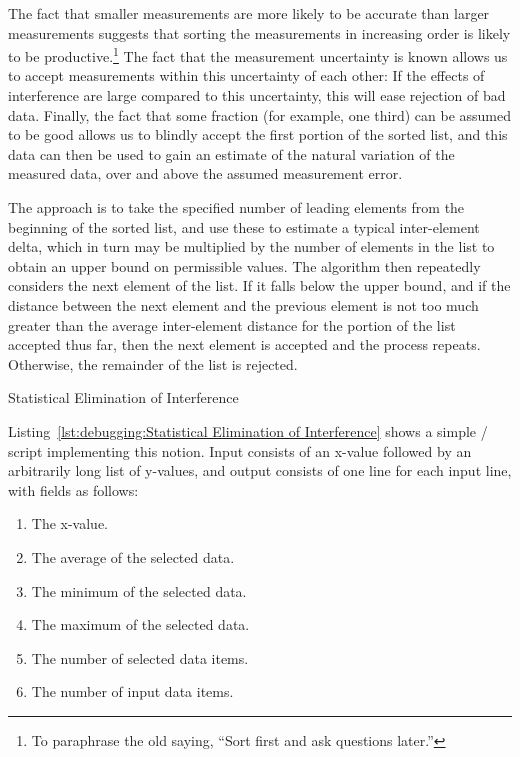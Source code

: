 The fact that smaller measurements are more likely to be accurate than
larger measurements suggests that sorting the measurements in increasing
order is likely to be productive.\footnote{
	To paraphrase the old saying, ``Sort first and ask questions later.''}
The fact that the measurement uncertainty is known allows us to accept
measurements within this uncertainty of each other:  If the effects of
interference are large compared to this uncertainty, this will ease
rejection of bad data.
Finally, the fact that some fraction (for example, one third) can be
assumed to be good allows us to blindly accept the first portion of the
sorted list, and this data can then be used to gain an estimate of the
natural variation of the measured data, over and above the assumed
measurement error.

The approach is to take the specified number of leading elements from the
beginning of the sorted list, and use these to estimate a typical
inter-element delta, which in turn may be multiplied by the number of
elements in the list to obtain an upper bound on permissible values.
The algorithm then repeatedly considers the next element of the list.
If it falls below the upper bound, and if the distance between
the next element and the previous element is not too much greater than
the average inter-element distance for the portion of the list accepted
thus far, then the next element is accepted and the process repeats.
Otherwise, the remainder of the list is rejected.

\begin{listing}[tb]

\caption{Statistical Elimination of Interference}
\label{lst:debugging:Statistical Elimination of Interference}
\end{listing}

Listing~\ref{lst:debugging:Statistical Elimination of Interference}
shows a simple / script implementing this notion.
Input consists of an x-value followed by an arbitrarily long list of y-values,
and output consists of one line for each input line, with fields as follows:

\begin{enumerate}
\item	The x-value.
\item	The average of the selected data.
\item	The minimum of the selected data.
\item	The maximum of the selected data.
\item	The number of selected data items.
\item	The number of input data items.
\end{enumerate}

